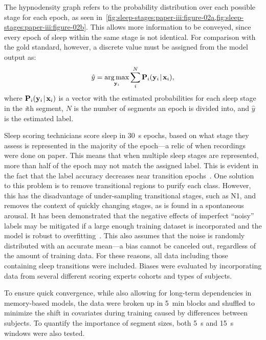 The hypnodensity graph refers to the probability distribution over each possible stage for each epoch, as seen in~\cref{fig:sleep-stages:paper-iii:figure-02a,fig:sleep-stages:paper-iii:figure-02b}.
This allows more information to be conveyed, since every epoch of sleep within the same stage is not identical. 
For comparison with the gold standard, however, a discrete value must be assigned from the model output as:
\begin{equation}
    \hat{y} = \operatorname*{arg\,max}_{\mathbf{y}_{i}} \sum_{i}^{N} \mathbf{P}_i \lparen \mathbf{y}_i \! \mid \! \mathbf{x}_i \rparen,
\end{equation}
where $\mathbf{P}_i \lparen \mathbf{y}_i \! \mid \! \mathbf{x}_i \rparen$ is a vector with the estimated probabilities for each sleep stage in the \textit{i}th segment, $N$ is the number of segments an epoch is divided into, and $\hat{y}$ is the estimated label. 

Sleep scoring technicians score sleep in \SI{30}{\second} epochs, based on what stage they assess is represented in the majority of the epoch---a relic of when recordings were done on paper. 
This means that when multiple sleep stages are represented, more than half of the epoch may not match the assigned label. 
This is evident in the fact that the label accuracy decreases near transition epochs~\cite{Rosenberg2013}.
One solution to this problem is to remove transitional regions to purify each class. 
However, this has the disadvantage of under-sampling transitional stages, such as \ac{N1}, and removes the context of quickly changing stages, as is found in a spontaneous arousal. 
It has been demonstrated that the negative effects of imperfect “noisy” labels may be mitigated if a large enough training dataset is incorporated and the model is robust to overfitting~\cite{Caruana2000}.
This also assumes that the noise is randomly distributed with an accurate mean---a bias cannot be canceled out, regardless of the amount of training data. 
For these reasons, all data including those containing sleep transitions were included. 
Biases were evaluated by incorporating data from several different scoring experts cohorts and types of subjects.

To ensure quick convergence, while also allowing for long-term dependencies in memory-based models, the data were broken up in \SI{5}{\minute} blocks and shuffled to minimize the shift in covariates during training caused by differences between subjects. 
To quantify the importance of segment sizes, both \SI{5}{\second} and \SI{15}{\second} windows were also tested.

